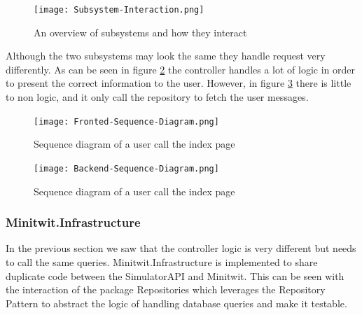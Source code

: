 \begin{figure}[H]
    \begin{center}
        \texttt{[image: Subsystem-Interaction.png]}
    \end{center}
    \caption{An overview of subsystems and how they interact}
    \label{fig:subsystem-interaction}
\end{figure}

Although the two subsystems may look the same they handle request very differently. As can be seen in figure \ref{fig:frontend-interaction} the controller handles a lot of logic in order to present the correct information to the user. However, in figure \ref{fig:backend-interaction} there is little to non logic, and it only call the repository to fetch the user messages.
\begin{figure}[H]
    \begin{center}
        \texttt{[image: Fronted-Sequence-Diagram.png]}
    \end{center}
    \caption{Sequence diagram of a user call the index page}
    \label{fig:frontend-interaction}
\end{figure}
\begin{figure}[H]
    \begin{center}
        \texttt{[image: Backend-Sequence-Diagram.png]}
    \end{center}
    \caption{Sequence diagram of a user call the index page}
    \label{fig:backend-interaction}
\end{figure}
\subsubsection{Minitwit.Infrastructure}
In the previous section we saw that the controller logic is very different but needs to call the same queries.
Minitwit.Infrastructure is implemented to share duplicate code between the SimulatorAPI and Minitwit. This can be seen with the interaction of the package Repositories which leverages the Repository Pattern to abstract the logic of handling database queries and make it testable.


